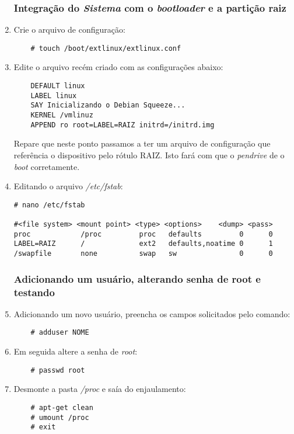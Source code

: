 \documentclass[a4paper,10pt]{article}
\begin{document}
\begin{enumerate}
    \subsubsection{Integração do \emph{Sistema} com o \emph{bootloader} e a partição raiz}
    \item Crie o arquivo de configuração:
      \begin{lstlisting}
	# touch /boot/extlinux/extlinux.conf
      \end{lstlisting}
    
    \item Edite o arquivo recém criado com as configurações abaixo:
      \begin{lstlisting}
	DEFAULT linux
	LABEL linux
	SAY Inicializando o Debian Squeeze...
	KERNEL /vmlinuz
	APPEND ro root=LABEL=RAIZ initrd=/initrd.img
      \end{lstlisting}
      Repare que neste ponto passamos a ter um arquivo de configuração que referência o 
      dispositivo pelo rótulo RAIZ. Isto fará com que o \emph{pendrive} de o \emph{boot}
      corretamente.

    \item Editando o arquivo \emph{/etc/fstab}:
      \begin{lstlisting}
# nano /etc/fstab

#<file system> <mount point> <type> <options>    <dump> <pass>
proc            /proc         proc   defaults         0      0
LABEL=RAIZ      /             ext2   defaults,noatime 0      1
/swapfile       none          swap   sw               0      0
      \end{lstlisting}
    \subsubsection{Adicionando um usuário, alterando senha de root e testando}
    \item Adicionando um novo usuário, preencha os campos solicitados pelo comando:
      \begin{lstlisting}
	# adduser NOME
      \end{lstlisting}

    \item Em seguida altere a senha de \emph{root}:
      \begin{lstlisting}
	# passwd root
      \end{lstlisting}

    \item Desmonte a pasta \emph{/proc} e saía do enjaulamento:
      \begin{lstlisting}
	# apt-get clean
	# umount /proc
	# exit
      \end{lstlisting}
    

\end{enumerate}
\end{document}
